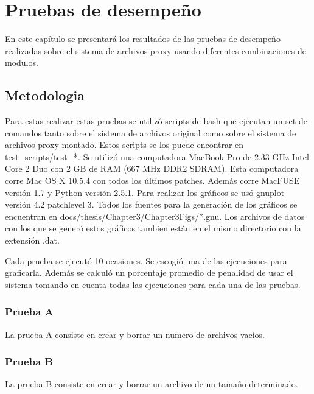 \chapter{Pruebas de desempeño}
\ifpdf
    \graphicspath{{Chapter3/Chapter3Figs/PNG/}{Chapter3/Chapter3Figs/PDF/}{Chapter3/Chapter3Figs/}}
\else
    \graphicspath{{Chapter3/Chapter3Figs/EPS/}{Chapter3/Chapter3Figs/}}
\fi

En este capítulo se presentará los resultados de las pruebas de desempeño realizadas sobre el sistema de archivos proxy usando diferentes combinaciones de modulos.


\section{Metodologia}

Para estas realizar estas pruebas se utilizó scripts de bash que ejecutan un set de comandos tanto sobre el sistema de archivos original como sobre el sistema de archivos proxy montado. Estos scripts se los puede encontrar en test\_scripts/test\_*. Se utilizó una computadora MacBook Pro de 2.33 GHz Intel Core 2 Duo con 2 GB de RAM (667 MHz DDR2 SDRAM). Esta computadora corre Mac OS X 10.5.4 con todos los últimos patches. Además corre MacFUSE versión 1.7 y Python versión 2.5.1. Para realizar los gráficos se usó gnuplot versión 4.2 patchlevel 3. Todos los fuentes para la generación de los gráficos se encuentran en docs/thesis/Chapter3/Chapter3Figs/*.gnu. Los archivos de datos con los que se generó estos gráficos tambien están en el mismo directorio con la extensión .dat.

Cada prueba se ejecutó 10 ocasiones. Se escogió una de las ejecuciones para graficarla. Además se calculó un porcentaje promedio de penalidad de usar el sistema tomando en cuenta todas las ejecuciones para cada una de las pruebas.

\subsection{Prueba A}

La prueba A consiste en crear y borrar un numero de archivos vacíos.

\subsection{Prueba B}

La prueba B consiste en crear y borrar un archivo de un tamaño determinado.


